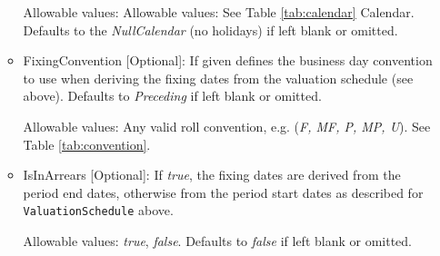 \begin{itemize}
\begin{itemize}
  Allowable values:   Allowable values: See Table \ref{tab:calendar} Calendar. Defaults to the \emph{NullCalendar} (no holidays) if left blank or omitted.

\item FixingConvention [Optional]: If given defines the business day convention to use when
  deriving the fixing dates from the valuation schedule (see above). Defaults to  \emph{Preceding} if left blank or omitted.

  Allowable values: Any valid roll convention, e.g. (\emph{F, MF, P, MP, U}). See Table \ref{tab:convention}.

\item IsInArrears [Optional]: If \emph{true}, the fixing dates are derived from the period end dates,
  otherwise from the period start dates as described for \lstinline!ValuationSchedule! above.

  Allowable values: \emph{true}, \emph{false}. Defaults to \emph{false} if left blank or omitted. 

\end{itemize}

\end{itemize}
